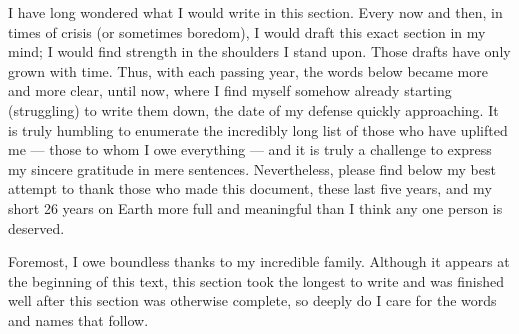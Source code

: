 \begin{acknowledgements}
I have long wondered what I would write in this section. 
Every now and then, in times of crisis (or sometimes boredom), I would draft this exact section in my mind; I would find strength in the shoulders I stand upon. 
Those drafts have only grown with time. 
Thus, with each passing year, the words below became more and more clear, until now, where I find myself somehow already starting (struggling) to write them down, the date of my defense quickly approaching. 
It is truly humbling to enumerate the incredibly long list of those who have uplifted me --- those to whom I owe everything --- and it is truly a challenge to express my sincere gratitude in mere sentences. 
Nevertheless, please find below my best attempt to thank those who made this document, these last five years, and my short 26 years on Earth more full and meaningful than I think any one person is deserved.

Foremost, I owe boundless thanks to my incredible family. 
Although it appears at the beginning of this text, this section took the longest to write and was finished well after this section was otherwise complete, so deeply do I care for the words and names that follow. 


\end{acknowledgements}
